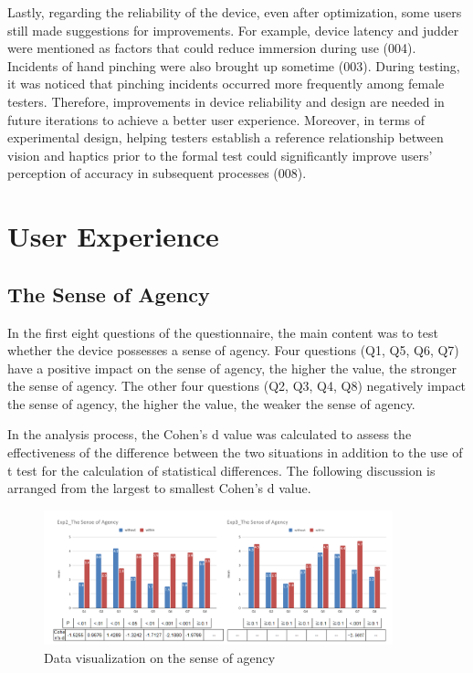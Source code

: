 Lastly, regarding the reliability of the device, even after optimization, some users still made suggestions for improvements. For example, device latency and judder were mentioned as factors that could reduce immersion during use (004). Incidents of hand pinching were also brought up sometime (003). During testing, it was noticed that pinching incidents occurred more frequently among female testers. Therefore, improvements in device reliability and design are needed in future iterations to achieve a better user experience. Moreover, in terms of experimental design, helping testers establish a reference relationship between vision and haptics prior to the formal test could significantly improve users' perception of accuracy in subsequent processes (008).

\section{User Experience}
\subsection{The Sense of Agency}
In the first eight questions of the questionnaire, the main content was to test whether the device possesses a sense of agency. Four questions (Q1, Q5, Q6, Q7) have a positive impact on the sense of agency, the higher the value, the stronger the sense of agency. The other four questions (Q2, Q3, Q4, Q8) negatively impact the sense of agency, the higher the value, the weaker the sense of agency.

In the analysis process, the Cohen’s d value was calculated to assess the effectiveness of the difference between the two situations in addition to the use of t test for the calculation of statistical differences. The following discussion is arranged from the largest to smallest Cohen's d value.

\begin{figure}[h]
\centering
\includegraphics[width=0.9\textwidth]{A_thesis/figures/040.png}
\caption{Data visualization on the sense of agency}
\end{figure}


